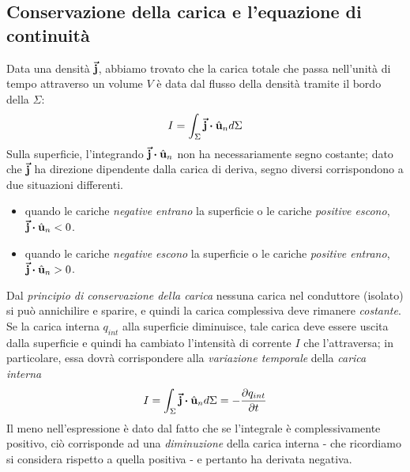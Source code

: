 \subsection{Conservazione della carica e l'equazione di continuità}
Data una densità $\vb*{\va{j}}$, abbiamo trovato che la carica totale che passa nell'unità di tempo attraverso un volume $V$ è data dal flusso della densità tramite il bordo della $\Sigma$:
\begin{equation*}
	I=\int_{\Sigma}\vba{j}\vdot\vbh{u}_nd\Sigma
\end{equation*}
Sulla superficie, l'integrando $\vba{j}\vdot\vbh{u}_n$ non ha necessariamente segno costante; dato che $\vb*{\va{j}}$ ha direzione dipendente dalla carica di deriva, segno diversi corrispondono a due situazioni differenti.
\begin{itemize}
	\item quando le cariche \textit{negative entrano} la superficie o le cariche \textit{positive escono}, $\vba{j}\vdot\vbh{u}_n<0$.
	\item  quando le cariche \textit{negative escono} la superficie o le cariche \textit{positive entrano}, $\vba{j}\vdot\vbh{u}_n>0$.
\end{itemize}
Dal \textit{principio di conservazione della carica} nessuna carica nel conduttore (isolato) si può annichilire e sparire, e quindi la carica complessiva deve rimanere \textit{costante}. Se la carica interna $q_{int}$ alla superficie diminuisce, tale carica deve essere uscita dalla superficie e quindi ha cambiato l'intensità di corrente $I$ che l'attraversa; in particolare, essa dovrà corrispondere alla \textit{variazione temporale} della \textit{carica interna}
\begin{equation}
	I=\int_{\Sigma}\vba{j}\vdot\vbh{u}_nd\Sigma=-\pdv{q_{int}}{t}
\end{equation}
Il meno nell'espressione è dato dal fatto che se l'integrale è complessivamente positivo, ciò corrisponde ad una \textit{diminuzione} della carica interna - che ricordiamo si considera rispetto a quella positiva - e pertanto ha derivata negativa.


